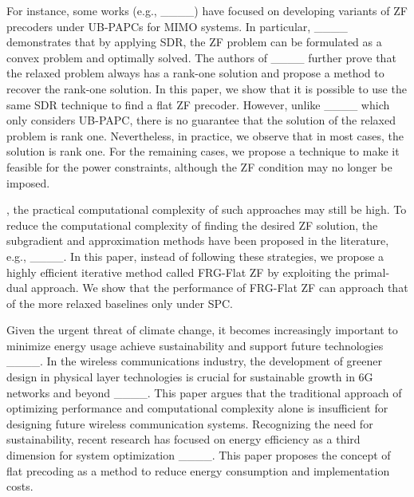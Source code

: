 For instance, some works (e.g., ____) have focused on developing variants of ZF precoders under UB-PAPCs for MIMO systems. In particular, ____ demonstrates that by applying SDR, the ZF problem can be formulated as a convex problem and optimally solved. The authors of ____ further prove that the relaxed problem always has a rank-one solution and propose a method to recover the rank-one solution. In this paper, we show that it is possible to use the same SDR technique to find a flat ZF precoder. However, unlike ____ which only considers UB-PAPC, there is no guarantee that the solution of the relaxed problem is rank one. Nevertheless, in practice, we observe that in most cases, the solution is rank one. For the remaining cases, we propose a technique to make it feasible for the power constraints, although the ZF condition may no longer be imposed.

, the practical computational complexity of such approaches may still be high. To reduce the computational complexity of finding the desired ZF solution, the subgradient and approximation methods have been proposed in the literature, e.g., ____. In this paper, instead of following these strategies, we propose a highly efficient iterative method called FRG-Flat ZF by exploiting the primal-dual approach. We show that the performance of FRG-Flat ZF can approach that of the more relaxed baselines only under SPC.

Given the urgent threat of climate change, it becomes increasingly important to minimize energy usage achieve sustainability and support future technologies ____. In the wireless communications industry, the development of greener design in physical layer technologies is crucial for sustainable growth in 6G networks and beyond ____. This paper argues that the traditional approach of optimizing performance and computational complexity alone is insufficient for designing future wireless communication systems. Recognizing the need for sustainability, recent research has focused on energy efficiency as a third dimension for system optimization ____. This paper proposes the  concept of flat precoding as a method to reduce energy consumption and implementation costs.

